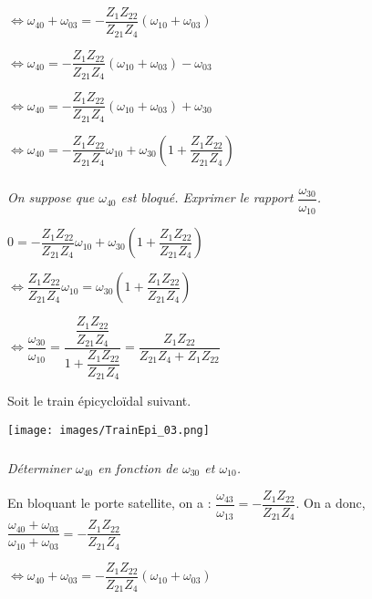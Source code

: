 \documentclass[10pt,fleqn]{article} %
\begin{document}
\begin{multicols}{2}
\begin{multicols}{2}
\begin{corrige}
  $\Leftrightarrow \omega_{40}+\omega_{03}=-\dfrac{Z_{1}Z_{22}}{Z_{21}Z_{4}}\left( \omega_{10}+\omega_{03} \right)$
  
  $\Leftrightarrow \omega_{40}=-\dfrac{Z_{1}Z_{22}}{Z_{21}Z_{4}}\left( \omega_{10}+\omega_{03} \right)-\omega_{03}$
  
    $\Leftrightarrow \omega_{40}=-\dfrac{Z_{1}Z_{22}}{Z_{21}Z_{4}}\left( \omega_{10}+\omega_{03} \right)+\omega_{30}$
    
      $\Leftrightarrow \omega_{40}=-\dfrac{Z_{1}Z_{22}}{Z_{21}Z_{4}}\omega_{10}+\omega_{30}\left( 1+\dfrac{Z_{1}Z_{22}}{Z_{21}Z_{4}} \right)$

 \end{corrige}
 \else
 \fi




\subparagraph{}
\textit{On suppose que $\omega_{40}$ est bloqué. Exprimer le rapport $\dfrac{\omega_{30}}{\omega_{10}}$.}
\ifprof
 \begin{corrige}
$0=-\dfrac{Z_{1}Z_{22}}{Z_{21}Z_{4}}\omega_{10}+\omega_{30}\left( 1+\dfrac{Z_{1}Z_{22}}{Z_{21}Z_{4}} \right)$

$\Leftrightarrow \dfrac{Z_{1}Z_{22}}{Z_{21}Z_{4}}\omega_{10}=\omega_{30}\left( 1+\dfrac{Z_{1}Z_{22}}{Z_{21}Z_{4}} \right)$


$\Leftrightarrow \dfrac{\omega_{30}}{\omega_{10}} 
= \dfrac{\dfrac{Z_{1}Z_{22}}{Z_{21}Z_{4}}}{ 1+\dfrac{Z_{1}Z_{22}}{Z_{21}Z_{4}} }
= \dfrac{Z_{1}Z_{22}}{ Z_{21}Z_{4}+Z_{1}Z_{22} }$


 \end{corrige}
 \else
 \fi





Soit le train épicycloïdal suivant. 

\begin{center}
 \texttt{[image: images/TrainEpi\_03.png]}
\end{center}

\subparagraph{}
\textit{Déterminer $\omega_{40}$ en fonction de  $\omega_{30}$ et $\omega_{10}$.}
 \ifprof
 \begin{corrige}
 
 En bloquant le porte satellite, on a : $\dfrac{\omega_{43}}{\omega_{13}}=-\dfrac{Z_{1}Z_{22}}{Z_{21}Z_{4}}$.
  On a donc, 
  $\dfrac{\omega_{40}+\omega_{03}}{\omega_{10}+\omega_{03}}=-\dfrac{Z_{1}Z_{22}}{Z_{21}Z_{4}}$

  $\Leftrightarrow \omega_{40}+\omega_{03}=-\dfrac{Z_{1}Z_{22}}{Z_{21}Z_{4}}\left( \omega_{10}+\omega_{03} \right)$
  

\end{corrige}
\end{multicols}
\end{multicols}
\end{document}
